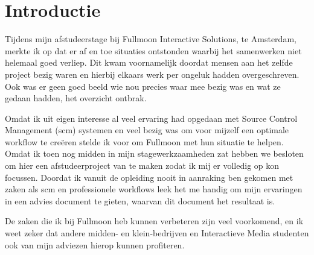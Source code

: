 \setcounter{chapter}{0}
\chapter{Introductie}
  
Tijdens mijn afstudeerstage bij Fullmoon Interactive Solutions, te Amsterdam, merkte ik op dat er af en toe situaties ontstonden waarbij het samenwerken niet helemaal goed verliep. Dit kwam voornamelijk doordat mensen aan het zelfde project bezig waren en hierbij elkaars werk per ongeluk hadden overgeschreven. Ook was er geen goed beeld wie nou precies waar mee bezig was en wat ze gedaan hadden, het overzicht ontbrak.
  
Omdat ik uit eigen interesse al veel ervaring had opgedaan met Source Control Management ({\sc scm}) systemen en veel bezig was om voor mijzelf een optimale workflow te creëren stelde ik voor om Fullmoon met hun situatie te helpen. Omdat ik toen nog midden in mijn stagewerkzaamheden zat hebben we besloten om hier een afstudeerproject van te maken zodat ik mij er volledig op kon focussen. Doordat ik vanuit de opleiding nooit in aanraking ben gekomen met zaken als {\sc scm} en professionele workflows leek het me handig om mijn ervaringen in een advies document te gieten, waarvan dit document het resultaat is.

De zaken die ik bij Fullmoon heb kunnen verbeteren zijn veel voorkomend, en ik weet zeker dat andere midden- en klein-bedrijven en Interactieve Media studenten ook van mijn adviezen hierop kunnen profiteren.
